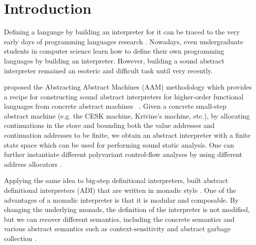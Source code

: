 \documentclass[acmsmall, review]{acmart}\settopmatter{}
\begin{document}


\maketitle


\section{Introduction}

Defining a language by building an interpreter for it can be traced to the very
early days of programming languages research \cite{McCarthy:1960:RFS:367177.367199,landin1966next, Reynolds:72}.
Nowadays, even undergraduate students in computer science learn how to define
their own programming languages by building an interpreter.
However, building a sound abstract interpreter remained an esoteric and difficult task
until very recently.

\citeauthor{van2012systematic} proposed the Abstracting Abstract Machines (AAM)
methodology which provides a recipe for constructing sound abstract interpreters
for higher-order functional languages from concrete abstract machines
~\cite{van2012systematic, van2010abstracting}.
Given a concrete small-step abstract machine (e.g. the CESK machine, Krivine's
machine, etc.), by allocating continuations in the store and bounding both the
value addresses and continuation addresses to be finite, we obtain an abstract
interpreter with a finite state space which can be used for performing sound
static analysis.
One can further instantiate different polyvariant control-flow analyses by using
different address allocators \cite{Gilray:2016:ACP:2951913.2951936}.

Applying the same idea to big-step definitional interpreters, \citeauthor{darais2017abstracting}
built abstract definitional interpreters (ADI) that are written in monadic style
\cite{darais2017abstracting}. One of the advantages of a monadic interpreter is
that it is modular and composable. By changing the underlying monads, the definition
of the interpreter is not modified, but we can recover different semantics, including
the concrete semantics and various abstract semantics such as context-sensitivity and
abstract garbage collection \cite{Sergey:2013:MAI:2491956.2491979}.
\end{document}
